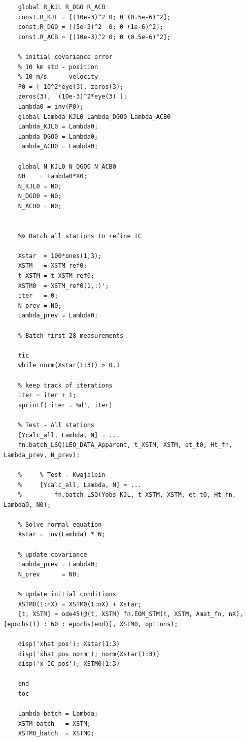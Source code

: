 \documentclass[conf]{new-aiaa}
\begin{document}
\begin{lstlisting}[basicstyle=\footnotesize]
	% weighting matrices m --> km, mm --> km 
	global R_KJL R_DGO R_ACB 
	const.R_KJL = [(10e-3)^2 0; 0 (0.5e-6)^2]; 
	const.R_DGO = [(5e-3)^2  0; 0 (1e-6)^2]; 
	const.R_ACB = [(10e-3)^2 0; 0 (0.5e-6)^2]; 
	
	% initial covariance error 
	% 10 km std - position 
	% 10 m/s    - velocity 
	P0 = [ 10^2*eye(3), zeros(3); 
	zeros(3),  (10e-3)^2*eye(3) ]; 
	Lambda0 = inv(P0); 
	global Lambda_KJL0 Lambda_DGO0 Lambda_ACB0
	Lambda_KJL0 = Lambda0; 
	Lambda_DGO0 = Lambda0; 
	Lambda_ACB0 = Lambda0; 
	
	global N_KJL0 N_DGO0 N_ACB0
	N0    = Lambda0*X0; 
	N_KJL0 = N0; 
	N_DGO0 = N0; 
	N_ACB0 = N0; 
	
	
	%% Batch all stations to refine IC 
	
	Xstar  = 100*ones(1,3); 
	XSTM   = XSTM_ref0; 
	t_XSTM = t_XSTM_ref0; 
	XSTM0  = XSTM_ref0(1,:)'; 
	iter   = 0; 
	N_prev = N0; 
	Lambda_prev = Lambda0; 
	
	% Batch first 28 measurements 
	
	tic 
	while norm(Xstar(1:3)) > 0.1
	
	% keep track of iterations 
	iter = iter + 1; 
	sprintf('iter = %d', iter)
	
	% Test - All stations 
	[Ycalc_all, Lambda, N] = ... 
	fn.batch_LSQ(LEO_DATA_Apparent, t_XSTM, XSTM, et_t0, Ht_fn, Lambda_prev, N_prev); 
	
	%     % Test - Kwajalein 
	%     [Ycalc_all, Lambda, N] = ... 
	%         fn.batch_LSQ(Yobs_KJL, t_XSTM, XSTM, et_t0, Ht_fn, Lambda0, N0); 
	
	% Solve normal equation 
	Xstar = inv(Lambda) * N; 
	
	% update covariance 
	Lambda_prev = Lambda0; 
	N_prev      = N0; 
	
	% update initial conditions 
	XSTM0(1:nX) = XSTM0(1:nX) + Xstar; 
	[t, XSTM] = ode45(@(t, XSTM) fn.EOM_STM(t, XSTM, Amat_fn, nX), [epochs(1) : 60 : epochs(end)], XSTM0, options); 
	
	disp('xhat pos'); Xstar(1:3)
	disp('xhat pos norm'); norm(Xstar(1:3))
	disp('x IC pos'); XSTM0(1:3)
	
	end 
	toc 
	
	Lambda_batch = Lambda; 
	XSTM_batch   = XSTM; 
	XSTM0_batch  = XSTM0; 
	
	
\end{lstlisting}
\end{document}
